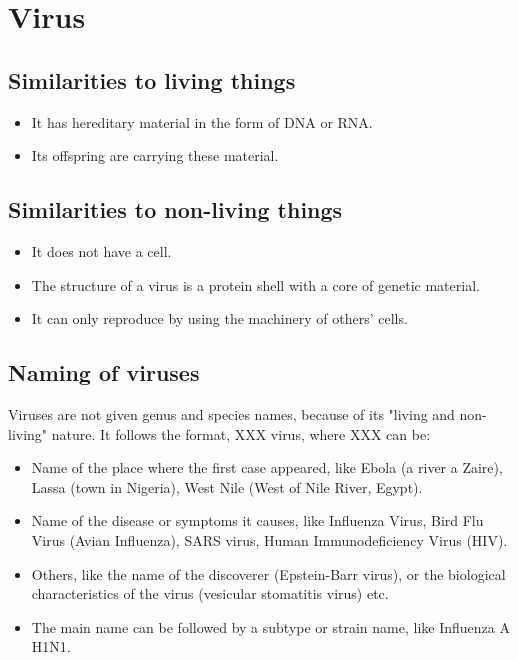 \documentclass[11pt]{article}
\begin{document}
\section{Virus}
\label{sec:org5365448}

\subsection{Similarities to living things}
\label{sec:org3e25149}
\begin{itemize}
\item It has hereditary material in the form of DNA or RNA.
\item Its offspring are carrying these material.
\end{itemize}

\subsection{Similarities to non-living things}
\label{sec:org2bd8881}
\begin{itemize}
\item It does not have a cell.
\item The structure of a virus is a protein shell with a core of genetic material.
\item It can only reproduce by using the machinery of others' cells.
\end{itemize}

\subsection{Naming of viruses}
\label{sec:org5b517bf}
Viruses are not given genus and species names, because of its "living and non-living" nature. It follows the format, XXX virus, where XXX can be:
\begin{itemize}
\item Name of the place where the first case appeared, like Ebola (a river a Zaire), Lassa (town in Nigeria), West Nile (West of Nile River, Egypt).
\item Name of the disease or symptoms it causes, like Influenza Virus, Bird Flu Virus (Avian Influenza), SARS virus, Human Immunodeficiency Virus (HIV).
\item Others, like the name of the discoverer (Epstein-Barr virus), or the biological characteristics of the virus (vesicular stomatitis virus) etc.
\item The main name can be followed by a subtype or strain name, like Influenza A H1N1.
\end{itemize}
\end{document}
